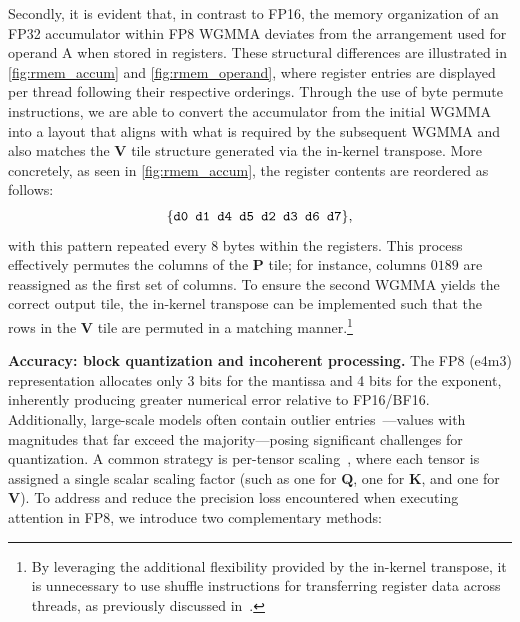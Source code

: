 Secondly, it is evident that, in contrast to FP16, the memory organization of an FP32 accumulator within FP8 WGMMA deviates from the arrangement used for operand A when stored in registers. These structural differences are illustrated in \cref{fig:rmem_accum} and \cref{fig:rmem_operand}, where register entries are displayed per thread following their respective orderings. Through the use of byte permute instructions, we are able to convert the accumulator from the initial WGMMA into a layout that aligns with what is required by the subsequent WGMMA and also matches the $\mathbf{V}$ tile structure generated via the in-kernel transpose. More concretely, as seen in \cref{fig:rmem_accum}, the register contents are reordered as follows:
$$\{ \verb|d0 d1 d4 d5 d2 d3 d6 d7| \},$$
with this pattern repeated every 8 bytes within the registers. This process effectively permutes the columns of the $\mathbf{P}$ tile; for instance, columns $0189$ are reassigned as the first set of columns. To ensure the second WGMMA yields the correct output tile, the in-kernel transpose can be implemented such that the rows in the $\mathbf{V}$ tile are permuted in a matching manner.\footnote{By leveraging the additional flexibility provided by the in-kernel transpose, it is unnecessary to use shuffle instructions for transferring register data across threads, as previously discussed in~\citep{colfax_fp8_flashattention_2024}.}

\textbf{Accuracy: block quantization and incoherent processing.} The FP8 (e4m3) representation allocates only 3 bits for the mantissa and 4 bits for the exponent, inherently producing greater numerical error relative to FP16/BF16. Additionally, large-scale models often contain outlier entries~\citep{dettmers2208llm, sun2024massive}—values with magnitudes that far exceed the majority—posing significant challenges for quantization. A common strategy is per-tensor scaling~\citep{micikevicius2022fp8}, where each tensor is assigned a single scalar scaling factor (such as one for $\mathbf{Q}$, one for $\mathbf{K}$, and one for $\mathbf{V}$). To address and reduce the precision loss encountered when executing attention in FP8, we introduce two complementary methods:

